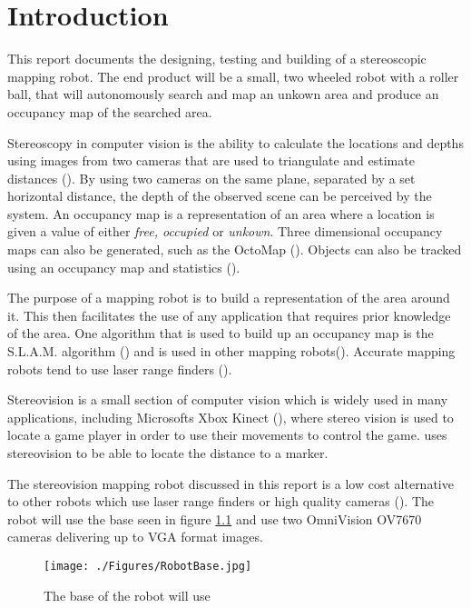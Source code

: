 \chapter{Introduction} \label{Chapter:Introduction}

%
%
%
%


This report documents the designing, testing and building of a stereoscopic mapping robot. The end product will be a small, two wheeled robot with a roller ball, that will autonomously search and map an unkown area and produce an occupancy map of the searched area. 

Stereoscopy in computer vision is the ability to calculate the locations and depths using images from two cameras that are used to triangulate and estimate distances (\cite{Saxena:DepthEstimation}). By using two cameras on the same plane, separated by a set horizontal distance, the depth of the observed scene can be perceived by the system.
An occupancy map is a representation of an area where a location is given a value of either \textit{free, occupied} or \textit{unkown}.  Three dimensional occupancy maps can also be generated, such as the OctoMap (\cite{octomap}). Objects can also be tracked using an occupancy map and statistics (\cite{Fleuret:OccupancyMap}). 

The purpose of a mapping robot is to build a representation of the area around it. This then facilitates the use of any application that requires prior knowledge of the area. One algorithm that is used to build up an occupancy map is the S.L.A.M. algorithm (\cite{Thrun:SLAM}) and is used in other mapping robots(\cite{Se:MappingRobot}). Accurate mapping robots tend to use laser range finders (\cite{Ruhnke:LaserMapping}).

Stereovision is a small section of computer vision which is widely used in many applications, including Microsofts Xbox Kinect (\cite{Microsoft:Kinect}), where stereo vision is used to locate a game player in order to use their movements to control the game. \cite{Mrovlje:Distance_Stereoscopic} uses stereovision to be able to locate the distance to a marker.

The stereovision mapping robot discussed in this report is a low cost alternative to other robots which use laser range finders or high quality cameras (\cite{Se:MappingRobot}). The robot will use the base seen in figure \ref{fig:RobotBase} and use two OmniVision OV7670 cameras delivering up to VGA format images.

\begin{figure}
\texttt{[image: ./Figures/RobotBase.jpg]}
\caption{The base of the robot will use}
\label{fig:RobotBase}
\end{figure}